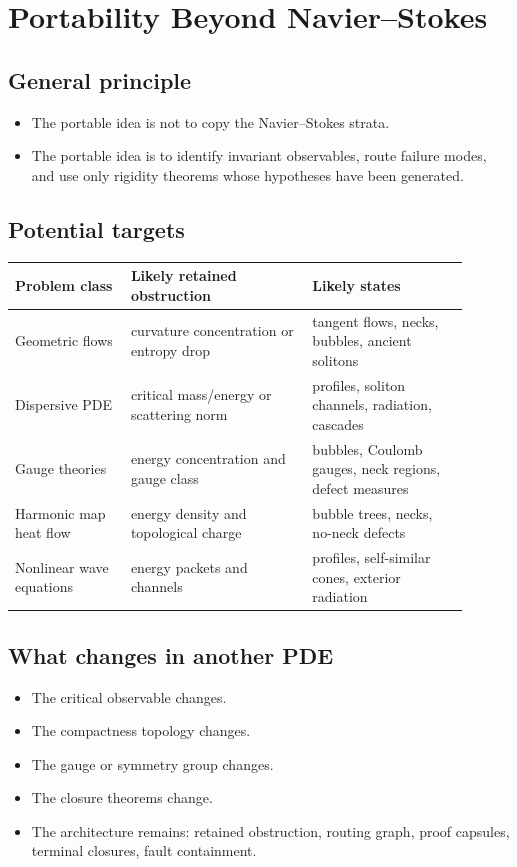 \documentclass[11pt]{article}
\theoremstyle{plain}
\theoremstyle{definition}
\theoremstyle{remark}
\newcommand{\NS}{Navier--Stokes}
\begin{document}
\section{Portability Beyond Navier--Stokes}
\label{sec:portability}

\subsection{General principle}
\begin{itemize}
  \item The portable idea is not to copy the \NS{} strata.
  \item The portable idea is to identify invariant observables, route failure modes, and use only rigidity theorems whose hypotheses have been generated.
\end{itemize}

\subsection{Potential targets}
\begin{center}
\begin{longtable}{p{0.23\linewidth}p{0.36\linewidth}p{0.31\linewidth}}
\toprule
Problem class & Likely retained obstruction & Likely states \\
\midrule
Geometric flows & curvature concentration or entropy drop & tangent flows, necks, bubbles, ancient solitons \\
Dispersive PDE & critical mass/energy or scattering norm & profiles, soliton channels, radiation, cascades \\
Gauge theories & energy concentration and gauge class & bubbles, Coulomb gauges, neck regions, defect measures \\
Harmonic map heat flow & energy density and topological charge & bubble trees, necks, no-neck defects \\
Nonlinear wave equations & energy packets and channels & profiles, self-similar cones, exterior radiation \\
\bottomrule
\end{longtable}
\end{center}

\subsection{What changes in another PDE}
\begin{itemize}
  \item The critical observable changes.
  \item The compactness topology changes.
  \item The gauge or symmetry group changes.
  \item The closure theorems change.
  \item The architecture remains: retained obstruction, routing graph, proof capsules, terminal closures, fault containment.
\end{itemize}
\end{document}
